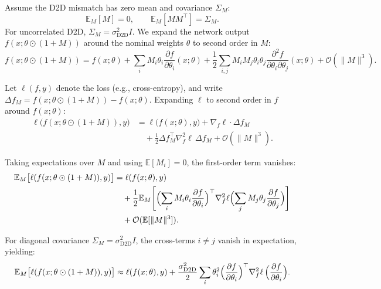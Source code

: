 Assume the D2D mismatch has zero mean and covariance $\Sigma_M$:
\begin{equation}
    \mathbb{E}_M[M] = 0, \qquad \mathbb{E}_M[MM^{\top}] = \Sigma_M.
\end{equation}
For uncorrelated D2D, $\Sigma_M = \sigma_{\text{D2D}}^2 I$. We expand the network output $f(x; \theta \odot (1+M))$ around the nominal weights $\theta$ to second order in $M$:
\begin{equation}
    f(x; \theta \odot (1+M)) = f(x; \theta) + \sum_i M_i \theta_i \frac{\partial f}{\partial \theta_i}(x; \theta) + \frac{1}{2}\sum_{i,j} M_i M_j \theta_i \theta_j \frac{\partial^2 f}{\partial \theta_i \partial \theta_j}(x; \theta) + \mathcal{O}(\|M\|^3).
    \label{eq:taylor-f}
\end{equation}

Let $\ell(f,y)$ denote the loss (e.g., cross-entropy), and write
$\Delta f_M=f(x;\theta\odot(1+M))-f(x;\theta)$. Expanding $\ell$ to
second order in $f$ around $f(x;\theta)$:
\begin{align}
    \ell\bigl(f(x; \theta \odot (1+M)), y\bigr)
    &= \ell\bigl(f(x;\theta), y\bigr)
    + \nabla_f \ell \cdot \Delta f_M \nonumber \\
    &\quad + \frac{1}{2}\Delta f_M^{\top} \nabla_f^2 \ell \, \Delta f_M
    + \mathcal{O}(\|M\|^3).
    \label{eq:taylor-loss}
\end{align}

Taking expectations over $M$ and using $\mathbb{E}[M_i] = 0$, the first-order term vanishes:
\begin{align}
    \mathbb{E}_M\bigl[\ell(f(x; \theta \odot (1+M)), y)\bigr]
    &= \ell(f(x;\theta), y) \nonumber \\
    &\quad + \frac{1}{2}\mathbb{E}_M\Biggl[
    \Bigl(\sum_i M_i \theta_i \frac{\partial f}{\partial \theta_i}\Bigr)^{\top}
    \nabla_f^2 \ell
    \Bigl(\sum_j M_j \theta_j \frac{\partial f}{\partial \theta_j}\Bigr)
    \Biggr] \nonumber \\
    &\quad + \mathcal{O}(\mathbb{E}[\|M\|^3]).
    \label{eq:expected-loss-second-order}
\end{align}

For diagonal covariance $\Sigma_M = \sigma_{\text{D2D}}^2 I$, the cross-terms $i \neq j$ vanish in expectation, yielding:
\begin{equation}
    \mathbb{E}_M\bigl[\ell(f(x; \theta \odot (1+M)), y)\bigr] \approx \ell(f(x;\theta), y) + \frac{\sigma_{\text{D2D}}^2}{2} \sum_i \theta_i^2 \Bigl(\frac{\partial f}{\partial \theta_i}\Bigr)^{\top} \nabla_f^2 \ell \, \Bigl(\frac{\partial f}{\partial \theta_i}\Bigr).
    \label{eq:implicit-regularizer-raw}
\end{equation}

